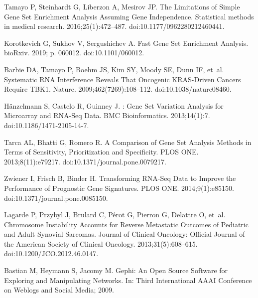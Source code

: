 \documentclass[10pt,letterpaper]{article}
\begin{document}
\begin{thebibliography}{10}
	Tamayo P, Steinhardt G, Liberzon A, Mesirov JP.
	\newblock The {{Limitations}} of {{Simple Gene Set Enrichment Analysis Assuming
			Gene Independence}}.
	\newblock Statistical methods in medical research. 2016;25(1):472--487.
	\newblock doi:{10.1177/0962280212460441}.

	Korotkevich G, Sukhov V, Sergushichev A.
	\newblock Fast Gene Set Enrichment Analysis.
	\newblock bioRxiv. 2019; p. 060012.
	\newblock doi:{10.1101/060012}.

	Barbie DA, Tamayo P, Boehm JS, Kim SY, Moody SE, Dunn IF, et~al.
	\newblock Systematic {{RNA}} Interference Reveals That Oncogenic
	{{KRAS}}-Driven Cancers Require {{TBK1}}.
	\newblock Nature. 2009;462(7269):108--112.
	\newblock doi:{10.1038/nature08460}.

	H{\"a}nzelmann S, Castelo R, Guinney J.
	: Gene Set Variation Analysis for Microarray and
	{{RNA}}-{{Seq}} Data.
	\newblock BMC Bioinformatics. 2013;14(1):7.
	\newblock doi:{10.1186/1471-2105-14-7}.

	Tarca AL, Bhatti G, Romero R.
	\newblock A {{Comparison}} of {{Gene Set Analysis Methods}} in {{Terms}} of
	{{Sensitivity}}, {{Prioritization}} and {{Specificity}}.
	\newblock PLOS ONE. 2013;8(11):e79217.
	\newblock doi:{10.1371/journal.pone.0079217}.

	Zwiener I, Frisch B, Binder H.
	\newblock Transforming {{RNA}}-{{Seq Data}} to {{Improve}} the {{Performance}}
	of {{Prognostic Gene Signatures}}.
	\newblock PLOS ONE. 2014;9(1):e85150.
	\newblock doi:{10.1371/journal.pone.0085150}.

	Lagarde P, Przybyl J, Brulard C, P{\'e}rot G, Pierron G, Delattre O, et~al.
	\newblock Chromosome Instability Accounts for Reverse Metastatic Outcomes of
	Pediatric and Adult Synovial Sarcomas.
	\newblock Journal of Clinical Oncology: Official Journal of the American
	Society of Clinical Oncology. 2013;31(5):608--615.
	\newblock doi:{10.1200/JCO.2012.46.0147}.

	Bastian M, Heymann S, Jacomy M.
	\newblock Gephi: An Open Source Software for Exploring and Manipulating
	Networks.
	\newblock In: Third International {{AAAI}} Conference on Weblogs and Social
	Media; 2009.


\end{thebibliography}
\end{document}
